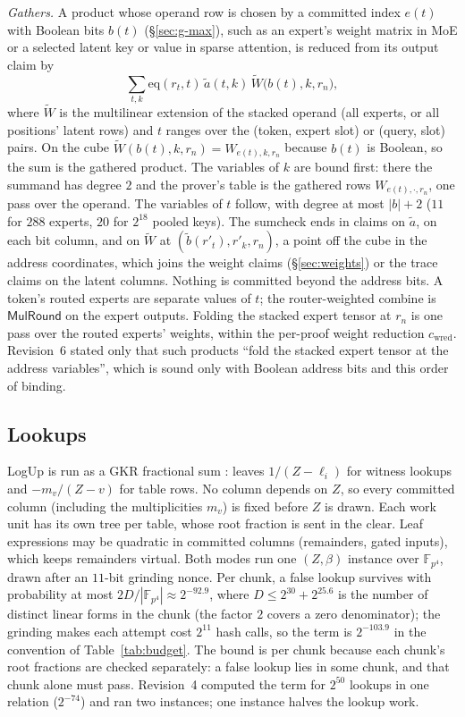\documentclass[11pt]{article}
\newcommand{\F}{\mathbb{F}}
\newcommand{\Fq}{\F_{p^4}}
\begin{document}
\emph{Gathers.}
\label{sec:gather}
A product whose operand row is chosen by a committed index \(e(t)\) with Boolean bits \(b(t)\) (\S\ref{sec:g-max}), such as an expert's weight matrix in MoE or a selected latent key or value in sparse attention, is reduced from its output claim by
\[
\textstyle\sum_{t, k} \mathrm{eq}(r_t, t)\, \tilde a(t, k)\, \tilde W\big(b(t), k, r_n\big),
\]
where \(\tilde W\) is the multilinear extension of the stacked operand (all experts, or all positions' latent rows) and \(t\) ranges over the (token, expert slot) or (query, slot) pairs.
On the cube \(\tilde W(b(t), k, r_n) = W_{e(t), k, r_n}\) because \(b(t)\) is Boolean, so the sum is the gathered product.
The variables of \(k\) are bound first: there the summand has degree \(2\) and the prover's table is the gathered rows \(W_{e(t), \cdot, r_n}\), one pass over the operand.
The variables of \(t\) follow, with degree at most \(|b| + 2\) (\(11\) for \(288\) experts, \(20\) for \(2^{18}\) pooled keys).
The sumcheck ends in claims on \(\tilde a\), on each bit column, and on \(\tilde W\) at \((\tilde b(r'_t), r'_k, r_n)\), a point off the cube in the address coordinates, which joins the weight claims (\S\ref{sec:weights}) or the trace claims on the latent columns.
Nothing is committed beyond the address bits.
A token's routed experts are separate values of \(t\); the router-weighted combine is \(\mathsf{MulRound}\) on the expert outputs.
Folding the stacked expert tensor at \(r_n\) is one pass over the routed experts' weights, within the per-proof weight reduction \(c_{\mathrm{wred}}\).
Revision~6 stated only that such products ``fold the stacked expert tensor at the address variables'', which is sound only with Boolean address bits and this order of binding.

\subsection{Lookups}
\label{sec:logup}

LogUp \cite{logup} is run as a GKR fractional sum \cite{logupgkr}: leaves \(1/(Z - \ell_i)\) for witness lookups and \(-m_v/(Z - v)\) for table rows.
No column depends on \(Z\), so every committed column (including the multiplicities \(m_v\)) is fixed before \(Z\) is drawn.
Each work unit has its own tree per table, whose root fraction is sent in the clear.
Leaf expressions may be quadratic in committed columns (remainders, gated inputs), which keeps remainders virtual.
Both modes run one \((Z, \beta)\) instance over \(\Fq\), drawn after an \(11\)-bit grinding nonce.
Per chunk, a false lookup survives with probability at most \(2D/|\Fq| \approx 2^{-92.9}\), where \(D \le 2^{30} + 2^{25.6}\) is the number of distinct linear forms in the chunk (the factor \(2\) covers a zero denominator); the grinding makes each attempt cost \(2^{11}\) hash calls, so the term is \(2^{-103.9}\) in the convention of Table~\ref{tab:budget}.
The bound is per chunk because each chunk's root fractions are checked separately: a false lookup lies in some chunk, and that chunk alone must pass.
Revision~4 computed the term for \(2^{50}\) lookups in one relation (\(2^{-74}\)) and ran two instances; one instance halves the lookup work.
\end{document}

